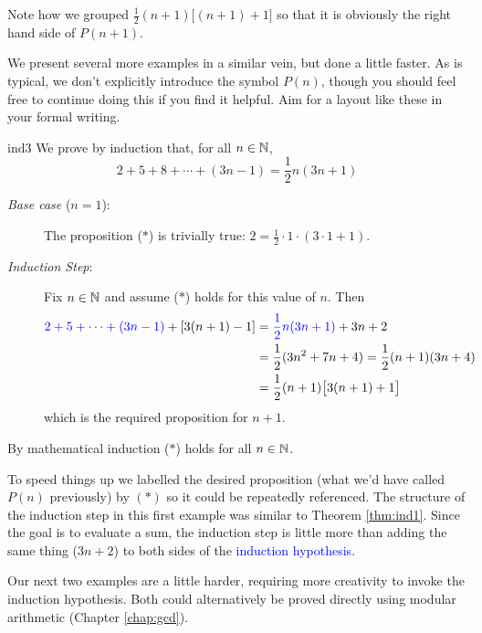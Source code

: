 Note how we grouped $\frac 12(n+1)\bigl[(n+1)+1\bigr]$ so that it is obviously the right hand side of $P(n+1)$.\smallbreak

We present several more examples in a similar vein, but done a little faster. As is typical, we don't explicitly introduce the symbol $P(n)$, though you should feel free to continue doing this if you find it helpful. Aim for a layout like these in your formal writing. 

% 

\begin{example}{}{ind3}
	We prove by induction that, for all $n\in\mathbb{N}$,
	\[
		2+5+8+\cdots+(3n-1)=\frac 12n(3n+1) \tag{$\ast$}
	\]
	\begin{description}
		\item[\normalfont\emph{Base case} ($n=1$):] The proposition ($\ast$) is trivially true: $2=\frac 12\cdot 1\cdot(3\cdot 1+1)$.
		\item[\normalfont\emph{Induction Step}:] Fix $n\in\mathbb{N}$ and assume ($\ast$) holds for this value of $n$. Then
		\begin{align*}
			\textcolor{blue}{2+5+\cdots+(3n-1)}+[3(n+1)-1]&=\textcolor{blue}{\frac 12n(3n+1)}+3n+2\\
			&=\frac 12(3n^2+7n+4) =\frac 12(n+1)(3n+4)\\
			&=\frac 12(n+1)\bigl[3(n+1)+1\bigr]
		\end{align*}
		which is the required proposition for $n+1$.
	\end{description}
	By mathematical induction ($\ast$) holds for all $n\in\mathbb{N}$.
\end{example}

To speed things up we labelled the desired proposition (what we'd have called $P(n)$ previously) by $(\ast)$ so it could be repeatedly referenced. The structure of the induction step in this first example was similar to Theorem \ref{thm:ind1}. Since the goal is to evaluate a sum, the induction step is little more than adding the same thing ($3n+2$) to both sides of the \textcolor{blue}{induction hypothesis}.\medbreak\goodbreak

Our next two examples are a little harder, requiring more creativity to invoke the induction hypothesis. Both could alternatively be proved directly using modular arithmetic (Chapter \ref{chap:gcd}).

